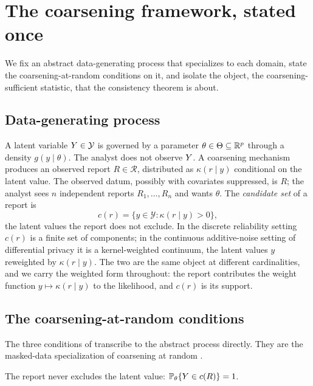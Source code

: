 \section{The coarsening framework, stated once}
\label{sec:framework}

We fix an abstract data-generating process that specializes to each
domain, state the coarsening-at-random conditions on it, and isolate
the object, the coarsening-sufficient statistic, that the consistency
theorem is about.

\subsection{Data-generating process}

A latent variable $Y \in \mathcal{Y}$ is governed by a parameter
$\theta \in \Theta \subseteq \mathbb{R}^p$ through a density $g(y \mid
\theta)$. The analyst does not observe $Y$. A coarsening mechanism
produces an observed report $R \in \mathcal{R}$, distributed as
$\kappa(r \mid y)$ conditional on the latent value. The observed
datum, possibly with covariates suppressed, is $R$; the analyst sees
$n$ independent reports $R_1, \ldots, R_n$ and wants $\theta$. The
\emph{candidate set} of a report is
\begin{equation}
  c(r) = \{ y \in \mathcal{Y} : \kappa(r \mid y) > 0 \},
  \label{eq:fw-candidate}
\end{equation}
the latent values the report does not exclude. In the discrete
reliability setting $c(r)$ is a finite set of components; in the
continuous additive-noise setting of differential privacy it is a
kernel-weighted continuum, the latent values $y$ reweighted by
$\kappa(r \mid y)$. The two are the same object at different
cardinalities, and we carry the weighted form throughout: the report
contributes the weight function $y \mapsto \kappa(r \mid y)$ to the
likelihood, and $c(r)$ is its support.

\subsection{The coarsening-at-random conditions}

The three conditions of \citet{towell2026masked} transcribe to the
abstract process directly. They are the masked-data specialization of
coarsening at random
\citep{heitjan1991ignorability,gill1997coarsening}.

\begin{condition}
\label{cond:c1}
The report never excludes the latent value: $\mathbb{P}_\theta\{Y \in
c(R)\} = 1$.
\end{condition}

